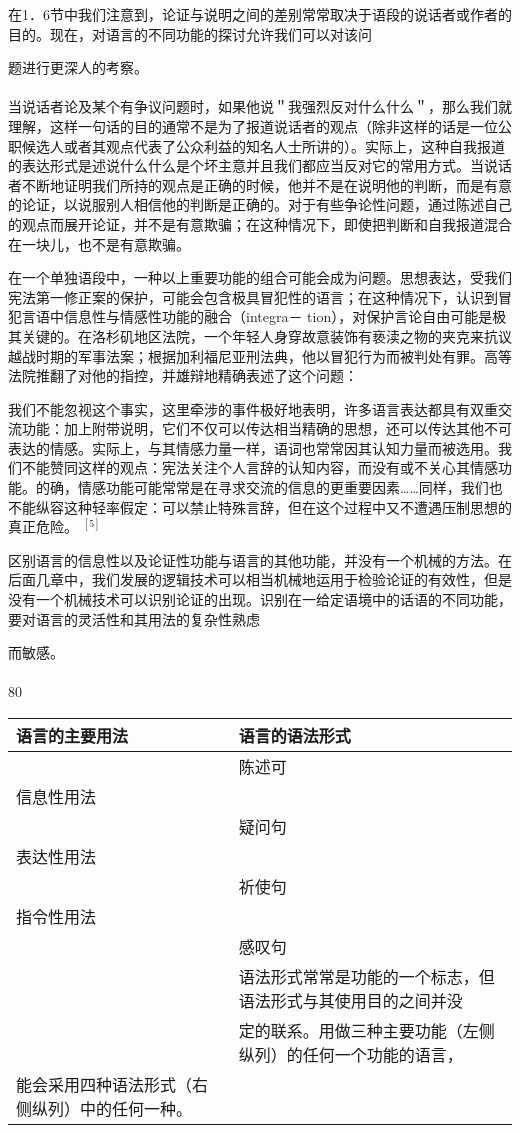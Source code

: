 在1．6节中我们注意到，论证与说明之间的差别常常取决于语段的说话者或作者的目的。现在，对语言的不同功能的探讨允许我们可以对该问

题进行更深人的考察。\\\\
当说话者论及某个有争议问题时，如果他说＂我强烈反对什么什么＂，那么我们就理解，这样一句话的目的通常不是为了报道说话者的观点（除非这样的话是一位公职候选人或者其观点代表了公众利益的知名人士所讲的）。实际上，这种自我报道的表达形式是述说什么什么是个坏主意并且我们都应当反对它的常用方式。当说话者不断地证明我们所持的观点是正确的时候，他并不是在说明他的判断，而是有意的论证，以说服别人相信他的判断是正确的。对于有些争论性问题，通过陈述自己的观点而展开论证，并不是有意欺骗；在这种情况下，即使把判断和自我报道混合在一块儿，也不是有意欺骗。

在一个单独语段中，一种以上重要功能的组合可能会成为问题。思想表达，受我们宪法第一修正案的保护，可能会包含极具冒犯性的语言；在这种情况下，认识到冒犯言语中信息性与情感性功能的融合（integra－ tion），对保护言论自由可能是极其关键的。在洛杉矶地区法院，一个年轻人身穿故意装饰有亵渎之物的夹克来抗议越战时期的军事法案；根据加利福尼亚刑法典，他以冒犯行为而被判处有罪。高等法院推翻了对他的指控，并雄辩地精确表述了这个问题：

我们不能忽视这个事实，这里牵涉的事件极好地表明，许多语言表达都具有双重交流功能：加上附带说明，它们不仅可以传达相当精确的思想，还可以传达其他不可表达的情感。实际上，与其情感力量一样，语词也常常因其认知力量而被选用。我们不能赞同这样的观点：宪法关注个人言辞的认知内容，而没有或不关心其情感功能。的确，情感功能可能常常是在寻求交流的信息的更重要因素……同样，我们也不能纵容这种轻率假定：可以禁止特殊言辞，但在这个过程中又不遭遇压制思想的真正危险。 ${ }^{[5]}$

区别语言的信息性以及论证性功能与语言的其他功能，并没有一个机械的方法。在后面几章中，我们发展的逻辑技术可以相当机械地运用于检验论证的有效性，但是没有一个机械技术可以识别论证的出现。识别在一给定语境中的话语的不同功能，要对语言的灵活性和其用法的复杂性熟虑

而敏感。\\\\
80

\begin{center}
\begin{tabular}{|l|l|}
\hline
语言的主要用法 & 语言的语法形式 \\
\hline
 & 陈述可 \\
\hline
信息性用法 &  \\
\hline
 & 疑问句 \\
\hline
表达性用法 &  \\
\hline
 & 祈使句 \\
\hline
指令性用法 &  \\
\hline
 & 感叹句 \\
\hline
 & 语法形式常常是功能的一个标志，但语法形式与其使用目的之间并没 \\
\hline
 & 定的联系。用做三种主要功能（左侧纵列）的任何一个功能的语言， \\
\hline
能会采用四种语法形式（右侧纵列）中的任何一种。 &  \\
\hline
\end{tabular}
\end{center} 